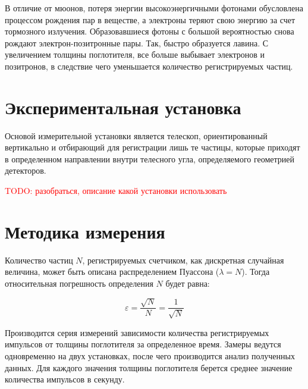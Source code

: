 \documentclass[reprint, nofootinbib, 10pt]{revtex4-2}
\begin{document}
В отличие от мюонов, потеря энергии высокоэнергичными фотонами обусловлена процессом
рождения пар в веществе, а электроны теряют свою энергию за счет тормозного излучения.
Образовавшиеся фотоны с большой вероятностью снова рождают электрон-позитронные пары.
Так, быстро образуется лавина. С увеличением толщины поглотителя, все больше выбывает
электронов и позитронов, в следствие чего уменьшается количество регистрируемых частиц. 


\section*{Экспериментальная установка}

Основой измерительной установки является телескоп, ориентированный вертикально и
отбирающий для регистрации лишь те частицы, которые приходят в определенном направлении
внутри телесного угла, определяемого геометрией детекторов.

\textcolor{red}{TODO: разобраться, описание какой установки использовать}


\section*{Методика измерения}

Количество частиц $N$, регистрируемых счетчиком, как дискретная случайная величина, может
быть описана распределением Пуассона ($\lambda = N$). Тогда относительная погрешность
определения $N$ будет равна:

\[ \varepsilon = \dfrac{\sqrt{N}}{N} = \dfrac{1}{\sqrt{N}} \]

Производится серия измерений зависимости количества регистрируемых импульсов от толщины
поглотителя за определенное время. Замеры ведутся одновременно на двух установках, после
чего производится анализ полученных данных. Для каждого значения толщины поглотителя
берется среднее значение количества импульсов в секунду.
\end{document}
